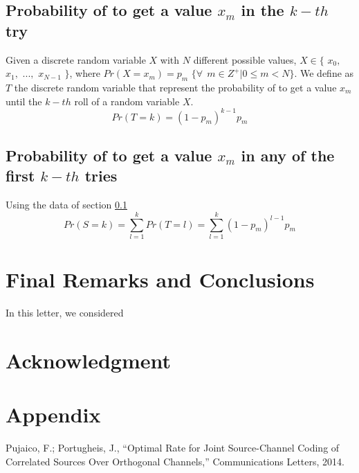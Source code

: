 \documentclass[journal]{IEEEtran}
\begin{document}
\subsection{Probability of to get a value $x_m$ in the $k-th$ try} 
\label{subsec:PT}
Given a discrete random variable $X$ with $N$ different possible values, $X \in \{$ 
$x_0,$ $x_1,$ $...,$ $x_{N-1}$ $\}$, where $Pr(X=x_m)=p_m$ $\{\forall~~m \in Z^+ | 0 \leq m < N\}$.
We define as $T$ the discrete random variable that represent
the probability of to get a value $x_m$ until the $k-th$ roll of a
random variable $X$.
\begin{equation}
 Pr(T=k)=\left(1- p_m\right)^{k-1} p_m
\end{equation}

\subsection{Probability of to get a value $x_m$ in any of the first $k-th$ tries} 
\label{subsec:PTall}
Using the data of section \ref{subsec:PT}
\begin{equation}
 Pr(S=k)=\sum_{l=1}^k Pr(T=l)=\sum_{l=1}^k {\left(1- p_m\right)^{l-1} p_m}
\end{equation}



\section{Final Remarks and Conclusions} 
\label{sec:Conclusions}
In this letter, we considered

\section*{Acknowledgment}


\section{Appendix} \label{sec:Appendix}

\begin{thebibliography}{99}

 Pujaico, F.; Portugheis, J.,
``Optimal Rate for Joint Source-Channel Coding of Correlated Sources Over 
Orthogonal Channels,'' Communications Letters, 2014.

\end{thebibliography}
\end{document}
